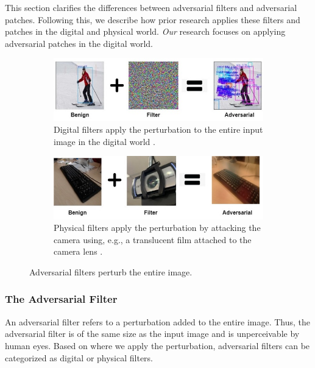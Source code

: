 This section clarifies the differences between adversarial filters and adversarial patches. Following this, we describe how prior research applies these filters and patches in the digital and physical world. \emph{Our} research focuses on applying adversarial patches in the digital world.

\begin{figure}[b]
    \centering
    \begin{subfigure}[b]{0.42\textwidth}
        \includegraphics[width=1\linewidth]{figures/chapter_detection/digital_filter.jpg}
        \caption{Digital filters apply the perturbation to the entire input image in the digital world \cite{wang2021daedalus}.}
        \label{fig:digital_filter}
    \end{subfigure}
    \begin{subfigure}[b]{0.42\textwidth}
        \includegraphics[width=1\linewidth]{figures/chapter_detection/physical_filter.jpg}
        \caption{Physical filters apply the perturbation by attacking the camera using, e.g., a translucent film attached to the camera lens \cite{li2019adversarial}.}
        \label{fig:physical_filter}
    \end{subfigure}
    \caption{Adversarial filters perturb the entire image.}
    \label{fig:filter}
\end{figure}

\subsubsection{The Adversarial Filter}

An adversarial filter refers to a perturbation added to the entire image. Thus, the adversarial filter is of the same size as the input image and is unperceivable by human eyes. Based on where we apply the perturbation, adversarial filters can be categorized as digital or physical filters.

